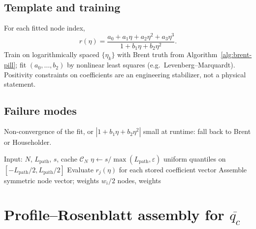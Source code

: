 \documentclass[11pt,a4paper]{article}
\begin{document}
\subsection{Template and training}
For each fitted node index,
\begin{equation}
  r(\eta) = \frac{a_0 + a_1\eta + a_2\eta^2 + a_3\eta^3}{1 + b_1\eta + b_2\eta^2}.
\end{equation}
Train on logarithmically spaced $\{\eta_k\}$ with Brent truth from Algorithm~\ref{alg:brent-pill}; fit $(a_0,\ldots,b_2)$ by nonlinear least squares (e.g.\ Levenberg--Marquardt). Positivity constraints on coefficients are an engineering stabilizer, not a physical statement.

\subsection{Failure modes}
Non-convergence of the fit, or $|1+b_1\eta+b_2\eta^2|$ small at runtime: fall back to Brent or Householder.

\begin{algorithm}[H]
\caption{Rational pill quantiles (cached)}
\label{alg:rat-eval}
\begin{algorithmic}[1]
\STATE Input: $N$, $L_{\mathrm{path}}$, $s$, cache $\mathcal{C}_N$
\STATE $\eta \gets s/\max(L_{\mathrm{path}},\varepsilon)$
\IF{$\eta < \varepsilon$} \RETURN uniform quantiles on $[-L_{\mathrm{path}}/2,L_{\mathrm{path}}/2]$ \ENDIF
\STATE Evaluate $r_j(\eta)$ for each stored coefficient vector
\STATE Assemble symmetric node vector; weights $w_i/2$
\RETURN nodes, weights
\end{algorithmic}
\end{algorithm}

\section{\texorpdfstring{Profile--Rosenblatt assembly for $\overline{q_c}$}{Profile-Rosenblatt assembly for layer-mean qc}}
\label{sec:profros-assembly}
\end{document}
